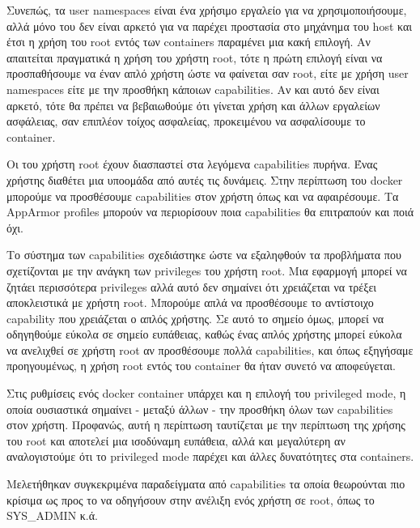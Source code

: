 \begin{description}[style=nextline]
Συνεπώς, τα \en user namespaces\gr{} είναι ένα χρήσιμο εργαλείο για να χρησιμοποιήσουμε, αλλά μόνο του δεν είναι αρκετό για να παρέχει προστασία στο μηχάνημα του \en host\gr{} και έτσι η χρήση του \en root\gr{} εντός των \en containers\gr{} παραμένει μια κακή επιλογή. Αν απαιτείται πραγματικά η χρήση του χρήστη \en root\gr{}, τότε η πρώτη επιλογή είναι να προσπαθήσουμε να  έναν απλό χρήστη ώστε να φαίνεται σαν \en root\gr{}, είτε με χρήση \en user namespaces\gr{} είτε με την προσθήκη κάποιων \en capabilities\gr{}. Αν και αυτό δεν είναι αρκετό, τότε θα πρέπει να βεβαιωθούμε ότι γίνεται χρήση και άλλων εργαλείων ασφάλειας, σαν επιπλέον τοίχος ασφαλείας, προκειμένου να ασφαλίσουμε το \en container\gr{}.

\item[\en Capabilities\gr{} του πυρήνα]
Οι  του χρήστη \en root\gr{} έχουν διασπαστεί στα λεγόμενα \en capabilities\gr{} πυρήνα. Ένας χρήστης διαθέτει μια υποομάδα από αυτές τις δυνάμεις. Στην περίπτωση του \en docker\gr{} μπορούμε να προσθέσουμε \en capabilities\gr{} στον χρήστη όπως και να αφαιρέσουμε. Τα \en AppArmor profiles\gr{} μπορούν να περιορίσουν ποια \en capabilities\gr{} θα επιτραπούν και ποιά όχι.

Το σύστημα των \en capabilities\gr{} σχεδιάστηκε ώστε να εξαληφθούν τα προβλήματα που σχετίζονται με την ανάγκη των \en privileges\gr{} του χρήστη \en root\gr{}. Μια εφαρμογή μπορεί να ζητάει περισσότερα \en privileges\gr{} αλλά αυτό δεν σημαίνει ότι χρειάζεται να τρέξει αποκλειστικά με χρήστη \en root\gr{}. Μπορούμε απλά να προσθέσουμε το αντίστοιχο \en capability\gr{} που χρειάζεται ο απλός χρήστης. Σε αυτό το σημείο όμως, μπορεί να οδηγηθούμε εύκολα σε σημείο ευπάθειας, καθώς ένας απλός χρήστης μπορεί εύκολα να ανελιχθεί σε χρήστη \en root\gr{} αν προσθέσουμε πολλά \en capabilities\gr{}, και όπως εξηγήσαμε προηγουμένως, η χρήση \en root\gr{} εντός του \en container\gr{} θα ήταν συνετό να αποφεύγεται.

Στις ρυθμίσεις ενός \en docker container\gr{} υπάρχει και η επιλογή του \en privileged mode\gr{}, η οποία ουσιαστικά σημαίνει - μεταξύ άλλων - την προσθήκη όλων των \en capabilities\gr{} στον χρήστη. Προφανώς, αυτή η περίπτωση ταυτίζεται με την περίπτωση της χρήσης του \en root\gr{} και αποτελεί μια ισοδύναμη ευπάθεια, αλλά και μεγαλύτερη αν αναλογιστούμε ότι το \en privileged mode\gr{} παρέχει και άλλες δυνατότητες στα \en containers\gr{}.

Μελετήθηκαν συγκεκριμένα παραδείγματα από \en capabilities\gr{} τα οποία θεωρούνται πιο κρίσιμα ως προς το να οδηγήσουν στην ανέλιξη ενός χρήστη σε \en root\gr{}, όπως το \en SYS\_ADMIN\gr{} κ.ά.


\end{description}
